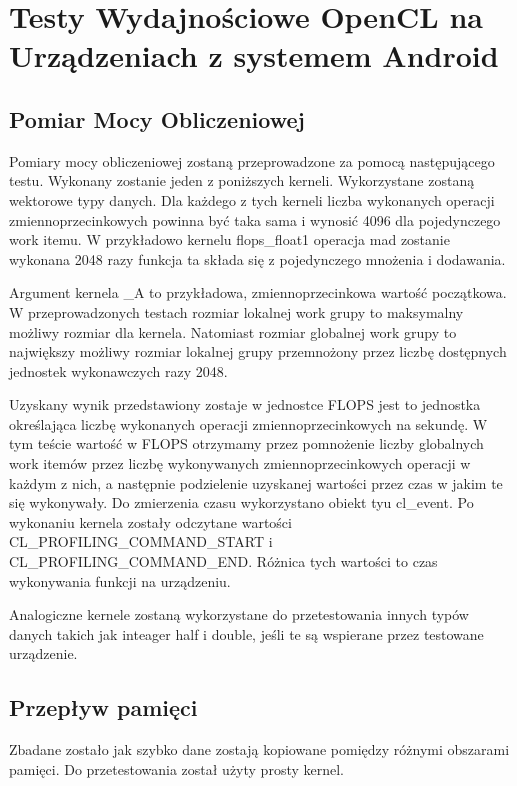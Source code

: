 \section[Testy Wydajnościowe OpenCL na Urządzeniach z systemem Android]{Testy Wydajnościowe OpenCL na Urządzeniach z systemem Android}

\subsection[Pomiar Mocy Obliczeniowej]{Pomiar Mocy Obliczeniowej}
Pomiary mocy obliczeniowej zostaną przeprowadzone za pomocą następującego testu.
Wykonany zostanie jeden z poniższych kerneli. Wykorzystane zostaną wektorowe typy danych. Dla każdego z tych kerneli liczba wykonanych operacji zmiennoprzecinkowych powinna być taka sama i wynosić 4096 dla pojedynczego work itemu. W przykładowo kernelu flops\_float1 operacja mad zostanie wykonana 2048 razy funkcja ta składa się z pojedynczego mnożenia i dodawania.



Argument kernela \_A to przykładowa, zmiennoprzecinkowa wartość początkowa. W przeprowadzonych testach rozmiar lokalnej work grupy to maksymalny możliwy rozmiar dla kernela. Natomiast rozmiar globalnej work grupy to największy możliwy rozmiar lokalnej grupy przemnożony przez liczbę dostępnych jednostek wykonawczych razy 2048.

Uzyskany wynik przedstawiony zostaje w jednostce FLOPS jest to jednostka określająca liczbę wykonanych operacji zmiennoprzecinkowych na sekundę. W tym teście wartość w FLOPS otrzymamy przez pomnożenie liczby globalnych work itemów przez liczbę wykonywanych zmiennoprzecinkowych operacji w każdym z nich, a następnie podzielenie uzyskanej wartości przez czas w jakim te się wykonywały. Do zmierzenia czasu wykorzystano obiekt tyu cl\_event. Po wykonaniu kernela zostały odczytane wartości CL\_PROFILING\_COMMAND\_START i CL\_PROFILING\_COMMAND\_END. Różnica tych wartości to czas wykonywania funkcji na urządzeniu.

Analogiczne kernele zostaną wykorzystane do przetestowania innych typów danych takich jak inteager half i double, jeśli te są wspierane przez testowane urządzenie.

\subsection[Przepływ pamięci]{Przepływ pamięci}
Zbadane zostało jak szybko dane zostają kopiowane pomiędzy różnymi obszarami pamięci. Do przetestowania został użyty prosty kernel.

